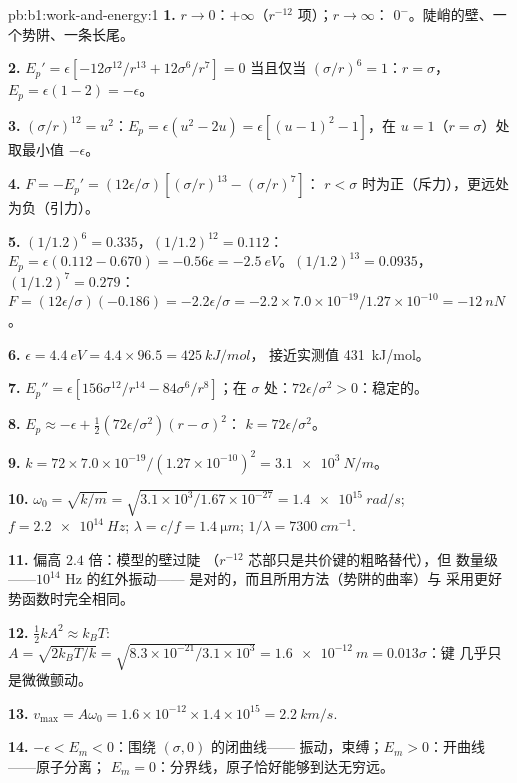 \begin{solution}{pb:b1:work-and-energy:1}
\textbf{1.} $r \to 0$：$+\infty$（$r^{-12}$ 项）；$r \to \infty$：
$0^-$。陡峭的壁、一个势阱、一条长尾。

\textbf{2.} $E_p' = \epsilon[-12\sigma^{12}/r^{13} + 12\sigma^6/r^7] = 0$ 当且仅当
$(\sigma/r)^6 = 1$：$r = \sigma$，$E_p = \epsilon(1 - 2) = -\epsilon$。

\textbf{3.} $(\sigma/r)^{12} = u^2$：$E_p = \epsilon(u^2 - 2u) = \epsilon[(u - 1)^2
- 1]$，在 $u = 1$（$r = \sigma$）处取最小值 $-\epsilon$。

\textbf{4.} $F = -E_p' = (12\epsilon/\sigma)[(\sigma/r)^{13} - (\sigma/r)^7]$：
$r < \sigma$ 时为正（斥力），更远处为负（引力）。

\textbf{5.} $(1/1.2)^6 = 0.335$，$(1/1.2)^{12} = 0.112$：$E_p = \epsilon(0.112
- 0.670) = -0.56\epsilon = \qty{-2.5}{eV}$。$(1/1.2)^{13} = 0.0935$，
$(1/1.2)^7 = 0.279$：$F = (12\epsilon/\sigma)(-0.186) = -2.2\epsilon/\sigma =
-2.2 \times 7.0\times10^{-19}/1.27\times10^{-10} = \qty{-12}{nN}$。

\textbf{6.} $\epsilon = \qty{4.4}{eV} = 4.4 \times 96.5 = \qty{425}{kJ/mol}$，
接近实测值 \qty{431}{kJ/mol}。

\textbf{7.} $E_p'' = \epsilon[156\sigma^{12}/r^{14} - 84\sigma^6/r^8]$；在
$\sigma$ 处：$72\epsilon/\sigma^2 > 0$：稳定的。

\textbf{8.} $E_p \approx -\epsilon + \tfrac12(72\epsilon/\sigma^2)(r - \sigma)^2$：
$k = 72\epsilon/\sigma^2$。

\textbf{9.} $k = 72 \times 7.0\times10^{-19}/(1.27\times10^{-10})^2 =
\qty{3.1e3}{N/m}$。

\textbf{10.} $\omega_0 = \sqrt{k/m} = \sqrt{3.1\times10^3/1.67\times10^{-27}} =
\qty{1.4e15}{rad/s}$; $f = \qty{2.2e14}{Hz}$; $\lambda = c/f = \qty{1.4}{\micro m}$;
$1/\lambda = \qty{7300}{cm^{-1}}$.

\textbf{11.} 偏高 $2.4$ 倍：模型的壁过陡
（$r^{-12}$ 芯部只是共价键的粗略替代），但
数量级——$10^{14}$ Hz 的红外振动——
是对的，而且所用方法（势阱的曲率）与
采用更好势函数时完全相同。

\textbf{12.} $\tfrac12 kA^2 \approx k_BT$: $A = \sqrt{2k_BT/k} = \sqrt{8.3\times
10^{-21}/3.1\times10^3} = \qty{1.6e-12}{m} = 0.013\sigma$：键
几乎只是微微颤动。

\textbf{13.} $v_{\max} = A\omega_0 = 1.6\times10^{-12} \times 1.4\times10^{15}
= \qty{2.2}{km/s}$.

\textbf{14.} $-\epsilon < E_m < 0$：围绕 $(\sigma, 0)$ 的闭曲线——
振动，束缚；$E_m > 0$：开曲线——原子分离；
$E_m = 0$：分界线，原子恰好能够到达无穷远。


\end{solution}
